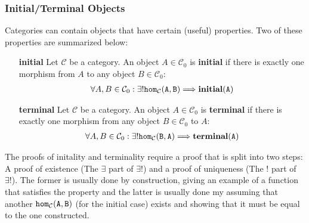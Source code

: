 \subsubsection{Initial/Terminal Objects}
Categories can contain objects that have certain (useful) properties. Two of these properties are summarized below:
\begin{itemize}
    \item[\textbf{initial}]  Let $\mathcal{C}$ be a category. An object $A\in\mathcal{C}_0$ is \textbf{initial} if there is exactly one morphism from $A$ to any object $B\in\mathcal{C}_0$: 
    \begin{align*}
        \forall A,B\in\mathcal{C}_0: \exists! \tt{hom}_\mathcal{C}(A,B) \Longrightarrow \textbf{initial}(A)
    \end{align*}
    \item[\textbf{terminal}]  Let $\mathcal{C}$ be a category. An object $A\in\mathcal{C}_0$ is \textbf{terminal} if there is exactly one morphism from any object $B\in\mathcal{C}_0$ to $A$:
    \begin{align*}
        \forall A,B\in\mathcal{C}_0: \exists! \tt{hom}_\mathcal{C}(B,A) \Longrightarrow \textbf{terminal}(A)
    \end{align*}
\end{itemize}
The proofs of initality and terminality require a proof that is split into two steps: A proof of existence (The $\exists$ part of $\exists!$) and a proof of uniqueness (The $!$ part of $\exists!$). The former is usually done by construction, giving an example of a function that satisfies the property and the latter is usually done my assuming that another $\tt{hom}_\mathcal{C}(A,B)$ (for the initial case) exists and showing that it must be equal to the one constructed.

